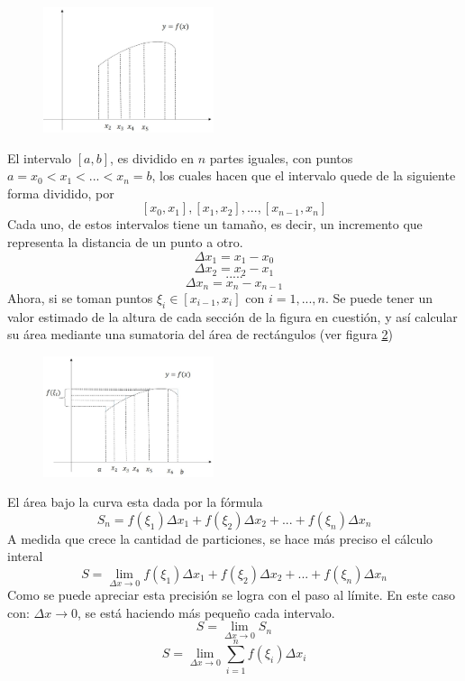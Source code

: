 \documentclass[10pt,twoside]{SelfArx} %
\begin{document}
 \begin{figure}[h]
 	\centering
 	\includegraphics[width=5cm]{integracion2}
 	\caption{}
 	\label{integracion2}
 	
 \end{figure}
 El intervalo $ [a,b] $, es dividido en $ n $ partes iguales, con puntos $ a=x_{0}< x_{1}<...<x_{n}=b $, los cuales hacen que el intervalo quede de la siguiente forma dividido, por 
 \[ [x_{0}, x_{1}], [x_{1},x_{2}],...,[x_{n-1},x_{n}] \]
 Cada uno, de estos intervalos tiene un tamaño, es decir, un incremento que representa la distancia de un punto a otro.
 \[ \Delta x_{1}=x_{1}-x_{0} \]
 \[ \Delta x_{2}=x_{2}-x_{1} \]
 \[ ..... \]
 \[ \Delta x_{n}=x_{n}-x_{n-1} \]
 Ahora, si se toman puntos $ \xi_{i}\in[x_{i-1},x_{i}] $ con $ i=1,...,n $. 
 Se puede tener un valor estimado de la altura de cada sección de la figura en cuestión, y así calcular su área mediante una sumatoria del área de rectángulos (ver figura \ref{integracion3})
 \begin{figure}[h]
 	\centering
 	\includegraphics[width=5cm]{integracion3}
 	\caption{}
 	\label{integracion3}
 \end{figure}
 El área bajo la curva esta dada por la fórmula
 \begin{equation}
 	S_{n}=f(\xi_{1})\Delta x_{1}+f(\xi_{2})\Delta x_{2}+...+f(\xi_{n})\Delta x_{n}
 \end{equation}
 A medida que crece la cantidad de particiones, se hace más preciso el cálculo interal
 \begin{equation}
 	S=\lim\limits_{\Delta x\rightarrow0}f(\xi_{1})\Delta x_{1}+f(\xi_{2})\Delta x_{2}+...+f(\xi_{n})\Delta x_{n}
 \end{equation}
 Como se puede apreciar esta precisión se logra con el paso al límite. En este caso con: $ \Delta x\rightarrow0 $, se está haciendo más pequeño cada intervalo.
 \begin{equation}
 	S=\lim\limits_{\Delta x\rightarrow0}S_{n}
 \end{equation}
 \begin{equation}
 	S=\lim\limits_{\Delta x\rightarrow 0}\sum_{i=1}^{n}f(\xi_{i})\Delta x_{i}
 \end{equation}
 
\end{document}
